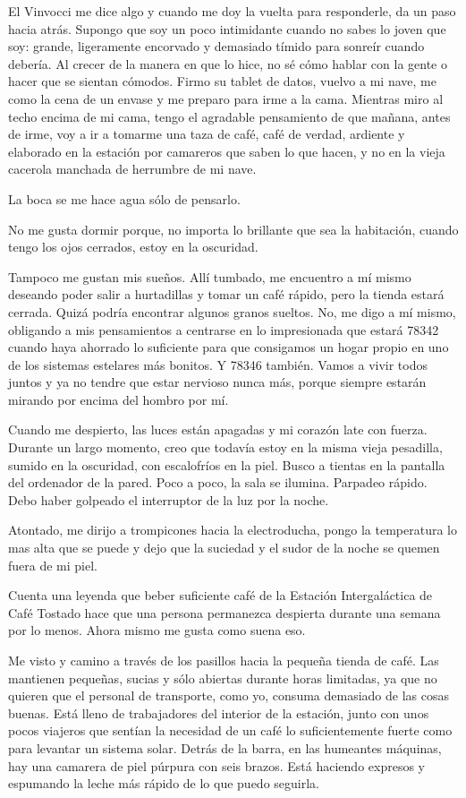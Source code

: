 El Vinvocci me dice algo y cuando me doy la vuelta para responderle, da
un paso hacia atrás. Supongo que soy un poco intimidante cuando no sabes
lo joven que soy: grande, ligeramente encorvado y demasiado tímido para
sonreír cuando debería. Al crecer de la manera en que lo hice, no sé
cómo hablar con la gente o hacer que se sientan cómodos. Firmo su tablet
de datos, vuelvo a mi nave, me como la cena de un envase y me preparo
para irme a la cama. Mientras miro al techo encima de mi cama, tengo el
agradable pensamiento de que mañana, antes de irme, voy a ir a tomarme
una taza de café, café de verdad, ardiente y elaborado en la estación
por camareros que saben lo que hacen, y no en la vieja cacerola manchada
de herrumbre de mi nave.

La boca se me hace agua sólo de pensarlo.

No me gusta dormir porque, no importa lo brillante que sea la
habitación, cuando tengo los ojos cerrados, estoy en la oscuridad.

Tampoco me gustan mis sueños. Allí tumbado, me encuentro a mí mismo
deseando poder salir a hurtadillas y tomar un café rápido, pero la
tienda estará cerrada. Quizá podría encontrar algunos granos
sueltos. No, me digo a mí mismo, obligando a mis pensamientos a
centrarse en lo impresionada que estará 78342 cuando haya ahorrado lo
suficiente para que consigamos un hogar propio en uno de los sistemas
estelares más bonitos. Y 78346 también. Vamos a vivir todos juntos y ya
no tendre que estar nervioso nunca más, porque siempre estarán mirando
por encima del hombro por mí.

Cuando me despierto, las luces están apagadas y mi corazón late con
fuerza. Durante un largo momento, creo que todavía estoy en la misma
vieja pesadilla, sumido en la oscuridad, con escalofríos en la
piel. Busco a tientas en la pantalla del ordenador de la pared. Poco a
poco, la sala se ilumina. Parpadeo rápido. Debo haber golpeado el
interruptor de la luz por la noche.

Atontado, me dirijo a trompicones hacia la electroducha, pongo la
temperatura lo mas alta que se puede y dejo que la suciedad y el sudor
de la noche se quemen fuera de mi piel.

Cuenta una leyenda que beber suficiente café de la Estación
Intergaláctica de Café Tostado hace que una persona permanezca despierta
durante una semana por lo menos. Ahora mismo me gusta como suena eso.

Me visto y camino a través de los pasillos hacia la pequeña tienda de
café. Las mantienen pequeñas, sucias y sólo abiertas durante horas
limitadas, ya que no quieren que el personal de transporte, como yo,
consuma demasiado de las cosas buenas. Está lleno de trabajadores del
interior de la estación, junto con unos pocos viajeros que sentían la
necesidad de un café lo suficientemente fuerte como para levantar un
sistema solar. Detrás de la barra, en las humeantes máquinas, hay una
camarera de piel púrpura con seis brazos. Está haciendo expresos y
espumando la leche más rápido de lo que puedo seguirla.

